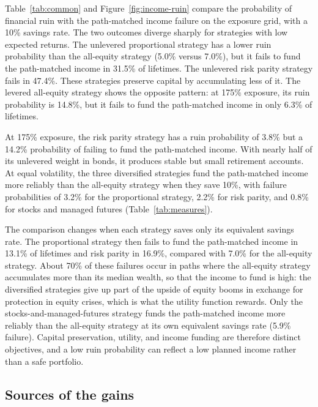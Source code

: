 \documentclass[12pt]{article}
\makeatletter
\newif\ifsubmission
\newcommand{\exhibitlist}{}
\newcommand{\exhibit}[1]{\ifsubmission\g@addto@macro\exhibitlist{}\else\fi}
\makeatother
\begin{document}
Table~\ref{tab:common} and Figure~\ref{fig:income-ruin} compare the probability of financial ruin with the
path-matched income failure on the exposure grid, with a 10\% savings rate. The two outcomes diverge
sharply for strategies with low expected returns. The unlevered proportional strategy has a lower ruin
probability than the all-equity strategy (5.0\% versus 7.0\%), but it fails to fund the path-matched
income in 31.5\% of lifetimes. The unlevered risk parity strategy fails in 47.4\%. These strategies
preserve capital by accumulating less of it. The levered all-equity strategy shows the opposite pattern:
at 175\% exposure, its ruin probability is 14.8\%, but it fails to fund the path-matched income in only
6.3\% of lifetimes.
\exhibit{figures/erc/common.tex}
\exhibit{figures/erc/fig_income_ruin.tex}

At 175\% exposure, the risk parity strategy has a ruin probability of 3.8\% but a 14.2\% probability of
failing to fund the path-matched income. With nearly half of its unlevered weight in bonds, it produces
stable but small retirement accounts. At equal volatility, the three diversified strategies fund the
path-matched income more reliably than the all-equity strategy when they save 10\%, with failure
probabilities of 3.2\% for the proportional strategy, 2.2\% for risk parity, and 0.8\% for stocks and
managed futures (Table~\ref{tab:measures}).

The comparison changes when each strategy saves only its equivalent savings rate. The proportional
strategy then fails to fund the path-matched income in 13.1\% of lifetimes and risk parity in 16.9\%,
compared with 7.0\% for the all-equity strategy. About 70\% of these failures occur in paths where
the all-equity strategy accumulates more than its median wealth, so that the income to fund is high: the
diversified strategies give up part of the upside of equity booms in exchange for protection in equity
crises, which is what the utility function rewards. Only the stocks-and-managed-futures strategy funds the
path-matched income more reliably than the all-equity strategy at its own equivalent savings rate (5.9\%
failure). Capital preservation, utility, and income funding are therefore distinct objectives, and a low
ruin probability can reflect a low planned income rather than a safe portfolio.

\subsection{Sources of the gains}
\label{sec:sleeves}
\end{document}
